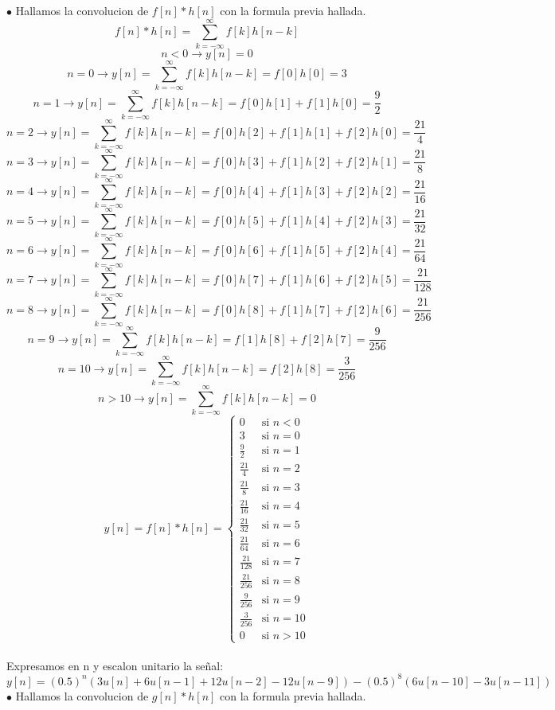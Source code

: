\documentclass[10pt,a4paper]{article}
\begin{document}
\begin{center}
\begin{enumerate}
$\bullet$ Hallamos la convolucion de $f[n]*h[n]$ con la formula previa hallada.
$$f[n]*h[n]=\sum_{k=-\infty}^{\infty}f[k]h[n-k]$$
$$n<0 \rightarrow y[n]=0$$
$$n=0 \rightarrow y[n]=\sum_{k=-\infty}^{\infty}f[k]h[n-k]=f[0]h[0]=3$$
$$n=1 \rightarrow y[n]=\sum_{k=-\infty}^{\infty}f[k]h[n-k]=f[0]h[1]+f[1]h[0]=\frac{9}{2}$$
$$n=2 \rightarrow y[n]=\sum_{k=-\infty}^{\infty}f[k]h[n-k]=f[0]h[2]+f[1]h[1]+f[2]h[0]=\frac{21}{4}$$
$$n=3 \rightarrow y[n]=\sum_{k=-\infty}^{\infty}f[k]h[n-k]=f[0]h[3]+f[1]h[2]+f[2]h[1]=\frac{21}{8}$$
$$n=4 \rightarrow y[n]=\sum_{k=-\infty}^{\infty}f[k]h[n-k]=f[0]h[4]+f[1]h[3]+f[2]h[2]=\frac{21}{16}$$
$$n=5 \rightarrow y[n]=\sum_{k=-\infty}^{\infty}f[k]h[n-k]=f[0]h[5]+f[1]h[4]+f[2]h[3]=\frac{21}{32}$$
$$n=6 \rightarrow y[n]=\sum_{k=-\infty}^{\infty}f[k]h[n-k]=f[0]h[6]+f[1]h[5]+f[2]h[4]=\frac{21}{64}$$
$$n=7 \rightarrow y[n]=\sum_{k=-\infty}^{\infty}f[k]h[n-k]=f[0]h[7]+f[1]h[6]+f[2]h[5]=\frac{21}{128}$$
$$n=8 \rightarrow y[n]=\sum_{k=-\infty}^{\infty}f[k]h[n-k]=f[0]h[8]+f[1]h[7]+f[2]h[6]=\frac{21}{256}$$
$$n=9 \rightarrow y[n]=\sum_{k=-\infty}^{\infty}f[k]h[n-k]=f[1]h[8]+f[2]h[7]=\frac{9}{256}$$
$$n=10 \rightarrow y[n]=\sum_{k=-\infty}^{\infty}f[k]h[n-k]=f[2]h[8]=\frac{3}{256}$$
$$n>10 \rightarrow y[n]=\sum_{k=-\infty}^{\infty}f[k]h[n-k]=0$$
\begin{equation*}
y[n]=f[n]*h[n] =
\begin{cases}
0 & \text{si $n<0 $}\\
3 & \text{si $n= 0$}\\
\frac{9}{2} & \text{si $n= 1$}\\
\frac{21}{4} & \text{si $n= 2$}\\
\frac{21}{8} & \text{si $n= 3$}\\
\frac{21}{16} & \text{si $n= 4$}\\
\frac{21}{32} & \text{si $n= 5$}\\
\frac{21}{64} & \text{si $n=6$}\\
\frac{21}{128} & \text{si $n=7$}\\
\frac{21}{256} & \text{si $n=8$}\\
\frac{9}{256} & \text{si $n=9$}\\
\frac{3}{256} & \text{si $n=10$}\\
0 & \text{si $n>10$}
\end{cases}
\end{equation*}\\
Expresamos en n y escalon unitario la señal:
$$\boxed{y[n]=(0.5)^n(3u[n]+6u[n-1]+12u[n-2]-12u[n-9])-(0.5)^8(6u[n-10]-3u[n-11])}$$
$\bullet$ Hallamos la convolucion de $g[n]*h[n]$ con la formula previa hallada.

\end{enumerate}
\end{center}
\end{document}
